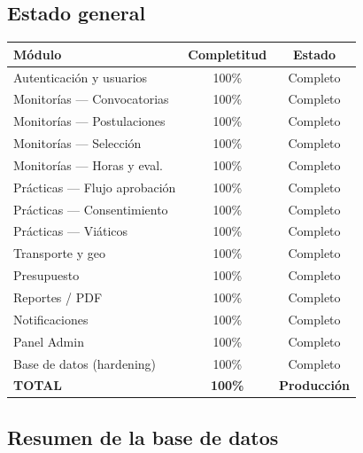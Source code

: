 \documentclass[12pt,a4paper]{article}
\begin{document}
\subsection{Estado general}

\begin{center}
\begin{tabular}{lcc}
  \toprule
  \textbf{Módulo} & \textbf{Completitud} & \textbf{Estado} \\
  \midrule
  Autenticación y usuarios      & 100\% & \textcolor{green!50!black}{Completo} \\
  Monitorías — Convocatorias    & 100\% & \textcolor{green!50!black}{Completo} \\
  Monitorías — Postulaciones    & 100\% & \textcolor{green!50!black}{Completo} \\
  Monitorías — Selección        & 100\% & \textcolor{green!50!black}{Completo} \\
  Monitorías — Horas y eval.    & 100\% & \textcolor{green!50!black}{Completo} \\
  Prácticas — Flujo aprobación  & 100\% & \textcolor{green!50!black}{Completo} \\
  Prácticas — Consentimiento    & 100\% & \textcolor{green!50!black}{Completo} \\
  Prácticas — Viáticos          & 100\% & \textcolor{green!50!black}{Completo} \\
  Transporte y geo              & 100\% & \textcolor{green!50!black}{Completo} \\
  Presupuesto                   & 100\% & \textcolor{green!50!black}{Completo} \\
  Reportes / PDF                & 100\% & \textcolor{green!50!black}{Completo} \\
  Notificaciones                & 100\% & \textcolor{green!50!black}{Completo} \\
  Panel Admin                   & 100\% & \textcolor{green!50!black}{Completo} \\
  Base de datos (hardening)     & 100\% & \textcolor{green!50!black}{Completo} \\
  \midrule
  \textbf{TOTAL}                & \textbf{100\%} & \textcolor{green!50!black}{\textbf{Producción}} \\
  \bottomrule
\end{tabular}
\end{center}

\subsection{Resumen de la base de datos}
\end{document}

